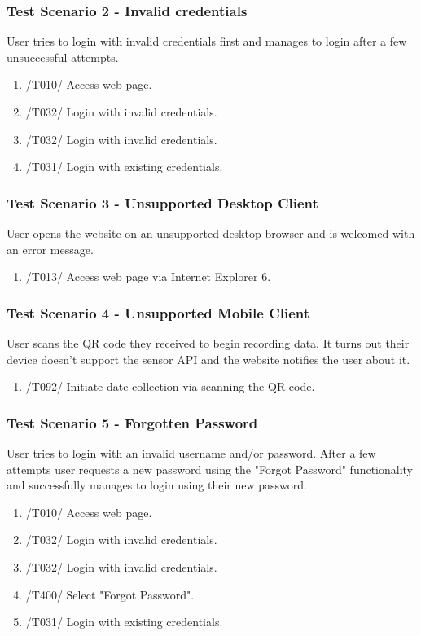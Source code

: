 \subsubsection{Test Scenario 2 - Invalid credentials}
User tries to login with invalid credentials first and manages to login after a few unsuccessful attempts.
\begin{enumerate}
    \item /T010/ Access web page.
    \item /T032/ Login with invalid credentials.
    \item /T032/ Login with invalid credentials.
    \item /T031/ Login with existing credentials.
\end{enumerate}
\subsubsection{Test Scenario 3 - Unsupported Desktop Client}
User opens the website on an unsupported desktop browser and is welcomed with an error message.
\begin{enumerate}
    \item /T013/ Access web page via Internet Explorer 6.
\end{enumerate} 
\subsubsection{Test Scenario 4 - Unsupported Mobile Client}
User scans the \gls{QR code} they received to begin recording data. It turns out their device doesn't support the \Gls{sensor} API and the website notifies the user about it.
\begin{enumerate}
    \item /T092/ Initiate date collection via scanning the \gls{QR code}.
\end{enumerate}
\subsubsection{Test Scenario 5 - Forgotten Password}
User tries to login with an invalid username and/or password. After a few attempts user requests a new password using the "Forgot Password" functionality and successfully manages to login using their new password.
\begin{enumerate}
    \item /T010/ Access web page.
    \item /T032/ Login with invalid credentials.
    \item /T032/ Login with invalid credentials.
    \item /T400/ Select "Forgot Password".
    \item /T031/ Login with existing credentials.
\end{enumerate} 
